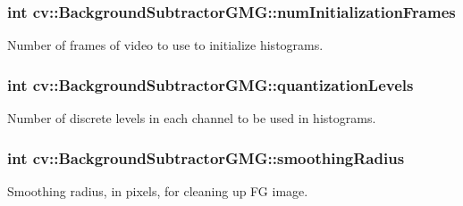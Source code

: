 \hypertarget{classcv_1_1BackgroundSubtractorGMG_a5378e398520be8ed6e696488d329b122}{
\subsubsection[{num\-Initialization\-Frames}]{\setlength{\rightskip}{0pt plus 5cm}int cv\-::\-Background\-Subtractor\-G\-M\-G\-::num\-Initialization\-Frames}}\label{classcv_1_1BackgroundSubtractorGMG_a5378e398520be8ed6e696488d329b122}


Number of frames of video to use to initialize histograms. 

\hypertarget{classcv_1_1BackgroundSubtractorGMG_a224018fca5b296390d4c94943c19202a}{
\subsubsection[{quantization\-Levels}]{\setlength{\rightskip}{0pt plus 5cm}int cv\-::\-Background\-Subtractor\-G\-M\-G\-::quantization\-Levels}}\label{classcv_1_1BackgroundSubtractorGMG_a224018fca5b296390d4c94943c19202a}


Number of discrete levels in each channel to be used in histograms. 

\hypertarget{classcv_1_1BackgroundSubtractorGMG_a243c4a842164e497af83707a5a1a9cf6}{
\subsubsection[{smoothing\-Radius}]{\setlength{\rightskip}{0pt plus 5cm}int cv\-::\-Background\-Subtractor\-G\-M\-G\-::smoothing\-Radius}}\label{classcv_1_1BackgroundSubtractorGMG_a243c4a842164e497af83707a5a1a9cf6}


Smoothing radius, in pixels, for cleaning up F\-G image. 

